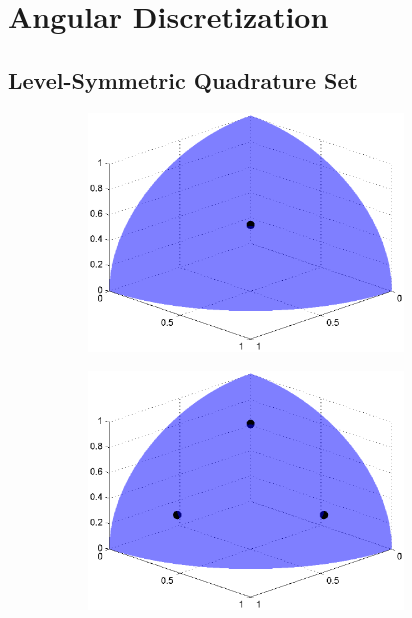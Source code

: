 \section{Angular Discretization}
\label{sec::Sn_Angle}


\subsection{Level-Symmetric Quadrature Set}
\label{sec::Sn_Angle_LS}

\begin{figure}
\centering
	\begin{subfigure}[b]{0.48\textwidth}
		\centering
		\includegraphics[width=0.92\textwidth]{figures/sec_Sn/LS2.eps}
		\caption{}
	\end{subfigure}
	\hfill
	\begin{subfigure}[b]{0.48\textwidth}
		\centering
		\includegraphics[width=0.92\textwidth]{figures/sec_Sn/LS4.eps}

\end{subfigure}
\end{figure}
